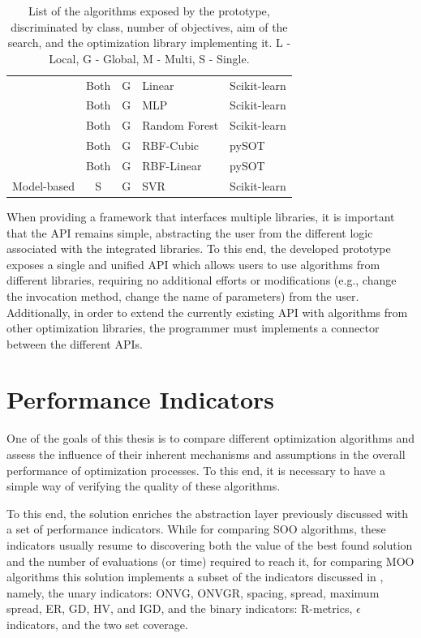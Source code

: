 \begin{table}[]
\begin{tabular}{cccll}
		& Both & G & Linear & Scikit-learn \\
		& Both & G & MLP & Scikit-learn \\
		& Both & G & Random Forest & Scikit-learn \\
		& Both & G & RBF-Cubic & pySOT \\
		& Both & G & RBF-Linear & pySOT \\
		\multirow{-10}{*}{Model-based} & S & G & SVR & Scikit-learn
	\end{tabular}
	\caption[List of the algorithms exposed by the solution's prototype]{List of the algorithms exposed by the prototype, discriminated by class, number of objectives, aim of the search, and the optimization library implementing it. L - Local, G - Global, M - Multi, S - Single.}
	\label{table:algorithms}
\end{table}

When providing a framework that interfaces multiple libraries, it is important that the \ac{API} remains simple, abstracting the user from the different logic associated with the integrated libraries. To this end, the developed prototype exposes a single and unified \ac{API} which allows users to use algorithms from different libraries, requiring no additional efforts or modifications (e.g., change the invocation method, change the name of parameters) from the user. Additionally, in order to extend the currently existing \ac{API} with algorithms from other optimization libraries, the programmer must implements a connector between the different \acp{API}.

 
\section{Performance Indicators}

One of the goals of this thesis is to compare different optimization algorithms and assess the influence of their inherent mechanisms and assumptions in the overall performance of optimization processes. To this end, it is necessary to have a simple way of verifying the quality of these algorithms. 

To this end, the solution enriches the abstraction layer previously discussed with a set of performance indicators. While for comparing \ac{SOO} algorithms, these indicators usually resume to discovering both the value of the best found solution and the number of evaluations (or time) required to reach it, for comparing \ac{MOO} algorithms this solution implements a subset of the indicators discussed in , namely, the unary indicators: \ac{ONVG}, \ac{ONVGR}, spacing, spread, maximum spread, \ac{ER}, \ac{GD}, \ac{HV}, and \ac{IGD}, and the binary indicators: R-metrics, $\epsilon$ indicators, and the two set coverage.


